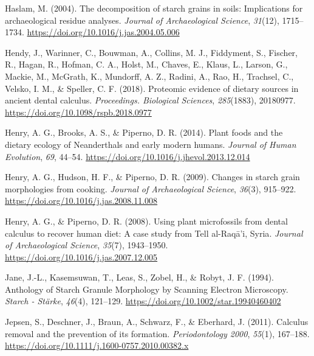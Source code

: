 \documentclass[
  letterpaper,
]{book}
\newlength{\cslhangindent}
\newlength{\cslentryspacingunit} %
\newenvironment{CSLReferences}[2] %
 {%
  \setlength{\parindent}{0pt}
  \ifodd #1
  \let\oldpar\par
  \def\par{\hangindent=\cslhangindent\oldpar}
  \fi
  \setlength{\parskip}{#2\cslentryspacingunit}
 }%
 {}
\begin{document}
\begin{CSLReferences}{1}{0}
\leavevmode{}%
Haslam, M. (2004). The decomposition of starch grains in soils:
Implications for archaeological residue analyses. \emph{Journal of
Archaeological Science}, \emph{31}(12), 1715--1734.
\url{https://doi.org/10.1016/j.jas.2004.05.006}

\leavevmode{}%
Hendy, J., Warinner, C., Bouwman, A., Collins, M. J., Fiddyment, S.,
Fischer, R., Hagan, R., Hofman, C. A., Holst, M., Chaves, E., Klaus, L.,
Larson, G., Mackie, M., McGrath, K., Mundorff, A. Z., Radini, A., Rao,
H., Trachsel, C., Velsko, I. M., \& Speller, C. F. (2018). Proteomic
evidence of dietary sources in ancient dental calculus.
\emph{Proceedings. Biological Sciences}, \emph{285}(1883), 20180977.
\url{https://doi.org/10.1098/rspb.2018.0977}

\leavevmode{}%
Henry, A. G., Brooks, A. S., \& Piperno, D. R. (2014). Plant foods and
the dietary ecology of {Neanderthals} and early modern humans.
\emph{Journal of Human Evolution}, \emph{69}, 44--54.
\url{https://doi.org/10.1016/j.jhevol.2013.12.014}

\leavevmode{}%
Henry, A. G., Hudson, H. F., \& Piperno, D. R. (2009). Changes in starch
grain morphologies from cooking. \emph{Journal of Archaeological
Science}, \emph{36}(3), 915--922.
\url{https://doi.org/10.1016/j.jas.2008.11.008}

\leavevmode{}%
Henry, A. G., \& Piperno, D. R. (2008). Using plant microfossils from
dental calculus to recover human diet: A case study from {Tell}
al-{Raqā}'i, {Syria}. \emph{Journal of Archaeological Science},
\emph{35}(7), 1943--1950.
\url{https://doi.org/10.1016/j.jas.2007.12.005}

\leavevmode{}%
Jane, J.-L., Kasemsuwan, T., Leas, S., Zobel, H., \& Robyt, J. F.
(1994). Anthology of {Starch Granule Morphology} by {Scanning Electron
Microscopy}. \emph{Starch - Stärke}, \emph{46}(4), 121--129.
\url{https://doi.org/10.1002/star.19940460402}

\leavevmode{}%
Jepsen, S., Deschner, J., Braun, A., Schwarz, F., \& Eberhard, J.
(2011). Calculus removal and the prevention of its formation.
\emph{Periodontology 2000}, \emph{55}(1), 167--188.
\url{https://doi.org/10.1111/j.1600-0757.2010.00382.x}


\end{CSLReferences}
\end{document}
